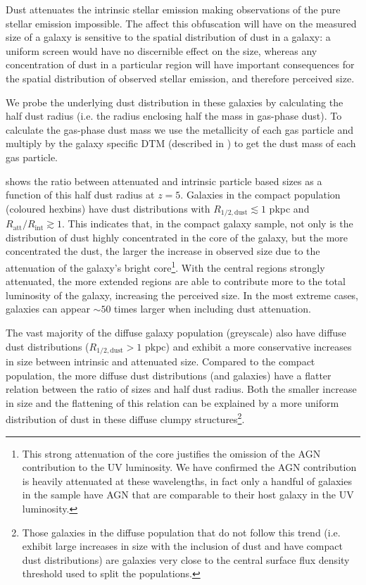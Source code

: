 Dust attenuates the intrinsic stellar emission making observations of the pure stellar emission impossible. The affect this obfuscation will have on the measured size of a galaxy is sensitive to the spatial distribution of dust in a galaxy: a uniform screen would have no discernible effect on the size, whereas any concentration of dust in a particular region will have important consequences for the spatial distribution of observed stellar emission, and therefore perceived size. 

We probe the underlying dust distribution in these galaxies by calculating the half dust radius (i.e. the radius enclosing half the mass in gas-phase dust). To calculate the gas-phase dust mass we use the metallicity of each gas particle and multiply by the galaxy specific $\mathrm{DTM}$ (described in ) to get the dust mass of each gas particle. 

 shows the ratio between attenuated and intrinsic particle based sizes as a function of this half dust radius at $z=5$. Galaxies in the compact population (coloured hexbins) have dust distributions with $R_{1/2, \mathrm{dust}} \lesssim 1$ pkpc and $R_{\mathrm{att}}/R_{\mathrm{int}}\gtrsim1$. This indicates that, in the compact galaxy sample, not only is the distribution of dust highly concentrated in the core of the galaxy, but the more concentrated the dust, the larger the increase in observed size due to the attenuation of the galaxy's bright core\footnote{This strong attenuation of the core justifies the omission of the AGN contribution to the UV luminosity. We have confirmed the AGN contribution is heavily attenuated at these wavelengths, in fact only a handful of galaxies in the sample have AGN that are comparable to their host galaxy in the UV luminosity.}. 
With the central regions strongly attenuated, the more extended regions are able to contribute more to the total luminosity of the galaxy, increasing the perceived size. In the most extreme cases, galaxies can appear $\sim50$ times larger when including dust attenuation.

The vast majority of the diffuse galaxy population (greyscale) also have diffuse dust distributions ($R_{1/2, \mathrm{dust}} > 1$ pkpc) and exhibit a more conservative increases in size between intrinsic and attenuated size. Compared to the compact population, the more diffuse dust distributions (and galaxies) have a flatter relation between the ratio of sizes and half dust radius. Both the smaller increase in size and the flattening of this relation can be explained by a more uniform distribution of dust in these diffuse clumpy structures\footnote{Those galaxies in the diffuse population that do not follow this trend (i.e. exhibit large increases in size with the inclusion of dust and have compact dust distributions) are galaxies very close to the central surface flux density threshold used to split the populations.}.

